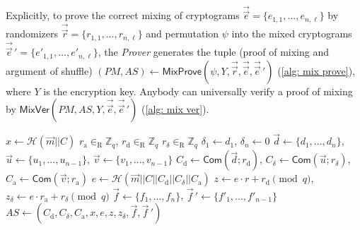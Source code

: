 Explicitly, to prove the correct mixing of cryptograms $\vec{\vec{e}} = \{ e_{1, 1}, ..., e_{n, \ell} \}$ by randomizers $\vec{\vec{r}} = \{ r_{1, 1}, ..., r_{n, \ell} \}$ and permutation $\psi$ into the mixed cryptograms $\vec{\vec{e}}\,' = \{ e'_{1, 1}, ..., e'_{n, \ell} \}$, the \textit{Prover} generates the tuple (proof of mixing and argument of shuffle) $(PM, AS) \gets \mathsf{MixProve}(\psi, Y, \vec{\vec{r}}, \vec{\vec{e}}, \vec{\vec{e}}\,')$ (\cref{alg: mix prove}), where $Y$ is the encryption key. Anybody can universally verify a proof of mixing by $\mathsf{MixVer}(PM, AS, Y, \vec{\vec{e}}, \vec{\vec{e}}\,')$ (\cref{alg: mix ver}).

\begin{algorithm}[ht]
    \DontPrintSemicolon
    \caption{$\mathsf{ASKCProve}(\psi; r; \vec{m}; C)$}
    \label{alg: askc prove}
    
    $x \gets \mathcal{H}(\vec{m} || C)$ \;
    $r_\mathrm{a} \in_\mathrm{R} \mathbb{Z}_q$, $r_\mathrm{d} \in_\mathrm{R} \mathbb{Z}_q$ $r_\delta \in_\mathrm{R} \mathbb{Z}_q$ \;
    $\delta_1 \gets d_1$, $\delta_n \gets 0$ \;
    $\vec{d} \gets \{ d_1, ..., d_n \}$, $\vec{u} \gets \{ u_1, ..., u_{n-1} \}$, $\vec{v} \gets \{ v_1, ..., v_{n-1} \}$ \;
    $C_\mathrm{d} \gets \mathsf{Com} (\vec{d}; r_\mathrm{d})$, $C_\delta \gets \mathsf{Com} (\vec{u}; r_\delta)$, $C_\mathrm{a} \gets \mathsf{Com} (\vec{v}; r_\mathrm{a})$ 
    $e \gets \mathcal{H}(\vec{m} || C || C_\mathrm{d} || C_\delta || C_\mathrm{a})$ \;
    $z \gets e \cdot r + r_\mathrm{d} \pmod q$, $z_\delta \gets e \cdot r_\mathrm{a} + r_\delta \pmod q$ \;
    $\vec{f} \gets \{ f_1, ..., f_n \}$, $\vec{f}\,' \gets \{ f'_1, ..., f'_{n-1} \}$ \;
    $AS \gets (C_\mathrm{d}, C_\delta, C_\mathrm{a}, x, e, z, z_\delta, \vec{f}, \vec{f}\,')$ \;
     
\end{algorithm}

